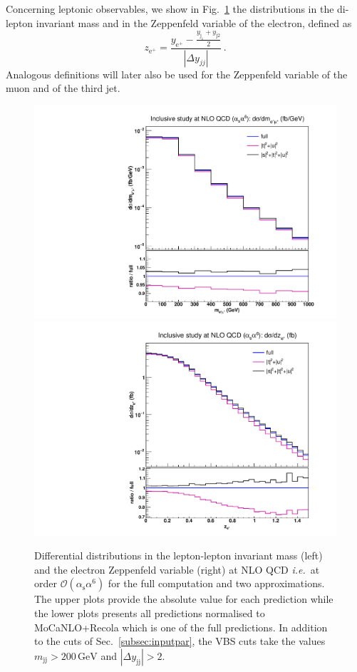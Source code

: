 \documentclass[twocolumn,epjc3]{svjour3} %
\newcommand{\Pj}{\ensuremath{\text{j}}\xspace}
\newcommand{\Pe}{\ensuremath{\text{e}}\xspace}
\newcommand{\GeV}{\ensuremath{\,\text{GeV}}\xspace}
\newcommand{\alphas}{\ensuremath{\alpha_\text{s}}\xspace}
\begin{document}
    Concerning leptonic observables, we show in Fig.~\ref{fig:mjjdyjj_1d_3} the distributions in the di-lepton invariant mass and in the Zeppenfeld variable of the electron, defined as
    \begin{equation}
      z_{\Pe^+} = \frac{y_{\Pe^+}-\frac{y_{\Pj_1}+y_{\Pj2}}2}{|\Delta y_{jj}|} \,.
      \label{eq:Zeppenfeld}
    \end{equation}
    Analogous definitions will later also be used for the Zeppenfeld variable of the muon and of the third jet.
    \begin{figure}[hbt]
    \centering
    {\includegraphics[scale=0.35]{figures/scanfigures/mll_nlo.pdf}}
    {\includegraphics[scale=0.35]{figures/scanfigures/zel_nlo.pdf}}
    \caption{Differential distributions in the lepton-lepton invariant mass (left) and the electron Zeppenfeld variable (right) at NLO QCD \emph{i.e.}\ at order $\mathcal{O}(\alphas\alpha^6)$ for the full computation and two approximations.
    The upper plots provide the absolute value for each prediction while the lower plots presents all predictions normalised to {\sc MoCaNLO}+{\sc Recola} which is one of the full predictions.
    In addition to the cuts of Sec.~\protect\ref{subsec:inputpar}, the VBS cuts take the values $m_{\Pj\Pj}>200 \GeV$ and $|\Delta y_{\Pj\Pj}|>2$.} 
    \label{fig:mjjdyjj_1d_3}
    \end{figure}
\end{document}
